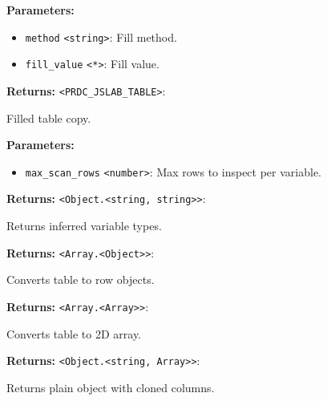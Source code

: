 \documentclass[12pt,a4paper]{article}
\begin{document}
\noindent \textbf{Parameters:}
\begin{itemize}
  \item \texttt{method} \texttt{<string>}: Fill method.
  \item \texttt{fill\_value} \texttt{<*>}: Fill value.
\end{itemize}

\noindent \textbf{Returns:} \texttt{<PRDC\_JSLAB\_TABLE>}:

\noindent Filled table copy.

\vspace{5mm}
\noindent {}


\noindent \textbf{Parameters:}
\begin{itemize}
  \item \texttt{max\_scan\_rows} \texttt{<number>}: Max rows to inspect per variable.
\end{itemize}

\noindent \textbf{Returns:} \texttt{<Object.<string, string>>}:

\noindent Returns inferred variable types.

\vspace{5mm}
\noindent {}


\noindent \textbf{Returns:} \texttt{<Array.<Object>>}:

\noindent Converts table to row objects.

\vspace{5mm}
\noindent {}


\noindent \textbf{Returns:} \texttt{<Array.<Array>>}:

\noindent Converts table to 2D array.

\vspace{5mm}
\noindent {}


\noindent \textbf{Returns:} \texttt{<Object.<string, Array>>}:

\noindent Returns plain object with cloned columns.
\end{document}
